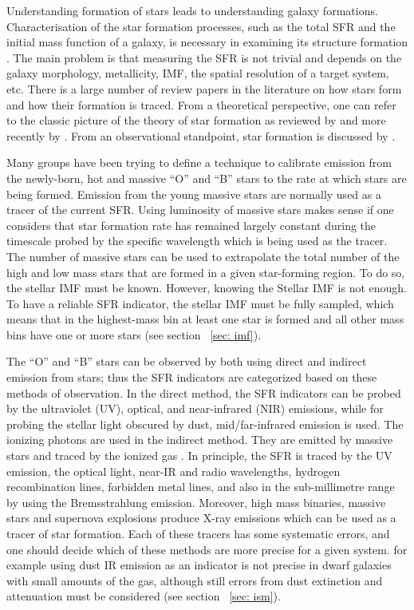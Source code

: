 Understanding formation of stars leads to understanding galaxy formations. Characterisation of the star formation processes, such as the total SFR and the initial mass function of a galaxy, is necessary in examining its structure formation \citep{McKee07}. The main problem is that measuring the SFR is not trivial and depends on the galaxy morphology, metallicity, IMF, the spatial resolution of a target system, etc. There is a large number of review papers in the literature on how stars form and how their formation is traced. From a theoretical perspective, one can refer to the classic picture of the theory of star formation as reviewed by \cite{Shu87} and more recently by \citep{McKee07}. From an observational standpoint, star formation is discussed by \cite{Kennicutt98b, Kewley02, Bell03, Calzetti07, Calzetti08, Calzetti10, Calzetti13, Kennicutt07, Kennicutt09, Boquien10, Hao11, Kennicutt12}.

Many groups have been trying to define a technique to calibrate emission from the newly-born, hot and massive ``O'' and ``B'' stars to the rate at which stars are being formed. Emission from the young massive stars are normally used as a tracer of the current SFR. Using luminosity of massive stars makes sense if one considers that star formation rate has remained largely constant during the timescale probed by the specific wavelength which is being used as the tracer. The number of massive stars can be used to extrapolate the total number of the high and low mass stars that are formed in a given star-forming region. To do so, the stellar IMF must be known. However, knowing the Stellar IMF is not enough. To have a reliable SFR indicator, the stellar IMF must be fully sampled, which means that in the highest-mass bin at least one star is formed and all other mass bins have one or more stars (see section ~\ref{sec: imf}).

The ``O'' and ``B'' stars can be observed by both using direct and indirect emission from stars; thus the SFR indicators are categorized based on these methods of observation. In the direct method, the SFR indicators can be probed by the ultraviolet (UV), optical, and near-infrared (NIR) emissions, while for probing the stellar light obscured by dust, mid/far-infrared emission is used. The ionizing photons are used in the indirect method. They are emitted by massive stars and traced by the ionized gas \citep[e.g.,][]{Calzetti04, Calzetti07}. In principle, the SFR is traced by the UV emission, the optical light, near-IR and radio wavelengths, hydrogen recombination lines, forbidden metal lines, and also in the sub-millimetre range by using the Bremsstrahlung emission. Moreover, high mass binaries, massive stars and supernova explosions produce X-ray emissions which can be used as a tracer of star formation. Each of these tracers has some systematic errors, and one should decide which of these methods are more precise for a given system. for example using dust IR emission as an indicator is not precise in dwarf galaxies with small amounts of the gas, although still errors from dust extinction and attenuation must be considered (see section ~\ref{sec: ism}).



